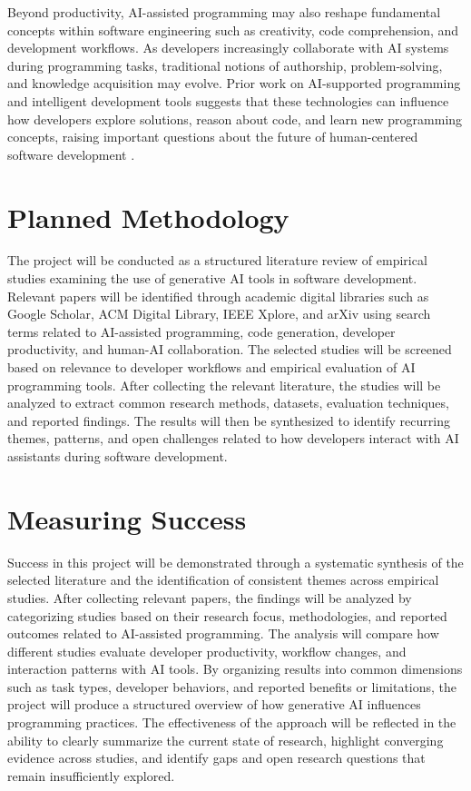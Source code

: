 Beyond productivity, AI-assisted programming may also reshape fundamental concepts within software engineering such as creativity, code comprehension, and development workflows. As developers increasingly collaborate with AI systems during programming tasks, traditional notions of authorship, problem-solving, and knowledge acquisition may evolve. Prior work on AI-supported programming and intelligent development tools suggests that these technologies can influence how developers explore solutions, reason about code, and learn new programming concepts, raising important questions about the future of human-centered software development \cite{robillard2014recommender,chen2021codex}.

\section{Planned Methodology}
The project will be conducted as a structured literature review of empirical studies examining the use of generative AI tools in software development. Relevant papers will be identified through academic digital libraries such as Google Scholar, ACM Digital Library, IEEE Xplore, and arXiv using search terms related to AI-assisted programming, code generation, developer productivity, and human-AI collaboration. The selected studies will be screened based on relevance to developer workflows and empirical evaluation of AI programming tools. After collecting the relevant literature, the studies will be analyzed to extract common research methods, datasets, evaluation techniques, and reported findings. The results will then be synthesized to identify recurring themes, patterns, and open challenges related to how developers interact with AI assistants during software development.

\section{Measuring Success}
Success in this project will be demonstrated through a systematic synthesis of the selected literature and the identification of consistent themes across empirical studies. After collecting relevant papers, the findings will be analyzed by categorizing studies based on their research focus, methodologies, and reported outcomes related to AI-assisted programming. The analysis will compare how different studies evaluate developer productivity, workflow changes, and interaction patterns with AI tools. By organizing results into common dimensions such as task types, developer behaviors, and reported benefits or limitations, the project will produce a structured overview of how generative AI influences programming practices. The effectiveness of the approach will be reflected in the ability to clearly summarize the current state of research, highlight converging evidence across studies, and identify gaps and open research questions that remain insufficiently explored.